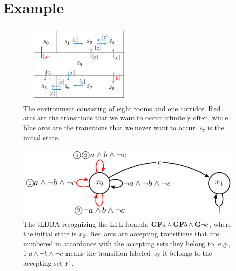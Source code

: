 \documentclass[a4j,12pt,oneside,openany,english,dvipdfmx]{jsbook}
\begin{document}
 \section{Example}

\begin{figure}[bp]
    \centering
    \includegraphics[bb=0 0 377 290,height=4cm,width=6cm]{MDP_corridor.png}
    \caption{The environment consisting of eight rooms and one corridor. Red arcs are the transitions that we want to occur infinitely often, while blue arcs are the transitions that we never want to occur. $s_7$ is the initial state.}
    \label{Grid1}
\end{figure}

\begin{figure}[htbp]
   \centering
   \vspace{2mm}
   \includegraphics[bb=0 0 247 80,scale=0.85]{ldgba_original.pdf}
   \caption{The tLDBA recognizing the LTL formula $\text{{\bf GF}}a \wedge \text{{\bf GF}}b \wedge \text{{\bf G}}\neg c$, where the initial state is $x_0$. Red arcs are accepting transitions that are numbered in accordance with the accepting sets they belong to, e.g., \textcircled{\scriptsize 1}$a \land \neg b \land \neg c$ means the transition labeled by it belongs to the accepting set $F_1$.}
   \label{automaton}
\end{figure}
\end{document}
